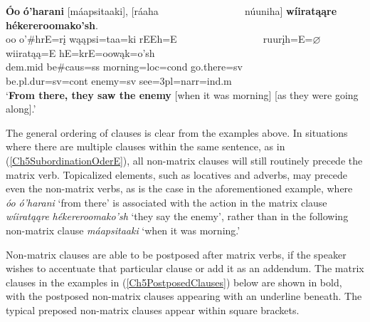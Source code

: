\begin{exe}
\begin{xlist}
        \item\label{Ch5SubordinationOderE} \glll \textbf{Óo} \textbf{ó'harani} \textnormal{[}máapsitaaki\textnormal{]}, \textnormal{[}ráaha ~ ~ ~ ~ ~ ~ ~ ~ ~ ~ núuniha\textnormal{]} \textbf{wíiratąąre} \textbf{hékereroomako'sh}.\\
        oo o'\#hrE=rį wąąpsi=taa=ki rEEh=E ~ ~ ~ ~ ~ ~ ~ ~ ~ ~ ruurįh=E=$\varnothing$ wiiratąą=E hE=krE=oowąk=o'sh\\
        dem.mid \textnormal{be}\#caus=ss \textnormal{morning}=loc=cond \textnormal{go.there}=sv ~ ~ ~ ~ ~ ~ ~ ~ ~ ~ \textnormal{be}.pl.dur=sv=cont \textnormal{enemy}=sv \textnormal{see}=3pl=narr=ind.m\\
        \glt `\textbf{From there, they saw the enemy} [when it was morning] [as they were going along].' \citep[98]{hollow1973a}
        
        
    \end{xlist}
\end{exe}

The general ordering of clauses is clear from the examples above. In situations where there are multiple clauses within the same sentence, as in (\ref{Ch5SubordinationOderE}), all non-matrix clauses will still routinely precede the matrix verb. Topicalized elements, such as locatives and adverbs, may precede even the non-matrix verbs, as is the case in the aforementioned example, where \textit{óo ó'harani} `from there' is associated with the action in the matrix clause \textit{wíiratąąre} \textit{hékereroomako'sh} `they say the enemy', rather than in the following non-matrix clause \textit{máapsitaaki} `when it was morning.'

Non-matrix clauses are able to be postposed after matrix verbs, if the speaker wishes to accentuate that particular clause or add it as an addendum. The matrix clauses in the examples in (\ref{Ch5PostposedClauses}) below are shown in bold, with the postposed non-matrix clauses appearing with an underline beneath. The typical preposed non-matrix clauses appear within square brackets.

